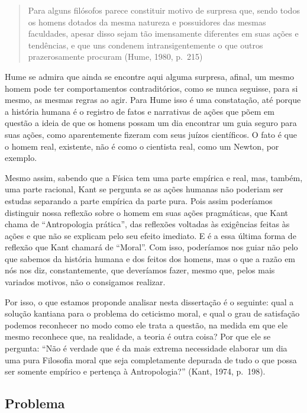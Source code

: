 \documentclass[
  brazilian,
  letterpaper,
  DIV=11,
  numbers=noendperiod]{scrartcl}
\begin{document}
\begin{quote}
Para alguns filósofos parece constituir motivo de surpresa que, sendo
todos os homens dotados da mesma natureza e possuidores das mesmas
faculdades, apesar disso sejam tão imensamente diferentes em suas ações
e tendências, e que uns condenem intransigentemente o que outros
prazerosamente procuram (Hume, 1980, p.~215)
\end{quote}

Hume se admira que ainda se encontre aqui alguma surpresa, afinal, um
mesmo homem pode ter comportamentos contraditórios, como se nunca
seguisse, para si mesmo, as mesmas regras ao agir. Para Hume isso é uma
constatação, até porque a história humana é o registro de fatos e
narrativas de ações que põem em questão a ideia de que os homens possam
um dia encontrar um guia seguro para suas ações, como aparentemente
fizeram com seus juízos científicos. O fato é que o homem real,
existente, não é como o cientista real, como um Newton, por exemplo.

Mesmo assim, sabendo que a Física tem uma parte empírica e real, mas,
também, uma parte racional, Kant se pergunta se as ações humanas não
poderiam ser estudas separando a parte empírica da parte pura. Pois
assim poderíamos distinguir nossa reflexão sobre o homem em suas ações
pragmáticas, que Kant chama de ``Antropologia prática'', das reflexões
voltadas às exigências feitas às ações e que não se explicam pelo seu
efeito imediato. E é a essa última forma de reflexão que Kant chamará de
``Moral''. Com isso, poderíamos nos guiar não pelo que sabemos da
história humana e dos feitos dos homens, mas o que a razão em nós nos
diz, constantemente, que deveríamos fazer, mesmo que, pelos mais
variados motivos, não o consigamos realizar.

Por isso, o que estamos proponde analisar nesta dissertação é o
seguinte: qual a solução kantiana para o problema do ceticismo moral, e
qual o grau de satisfação podemos reconhecer no modo como ele trata a
questão, na medida em que ele mesmo reconhece que, na realidade, a
teoria é outra coisa? Por que ele se pergunta: ``Não é verdade que é da
mais extrema necessidade elaborar um dia uma pura Filosofia moral que
seja completamente depurada de tudo o que possa ser somente empírico e
pertença à Antropologia?'' (Kant, 1974, p.~198).

\subsection{Problema}\label{problema}
\end{document}
